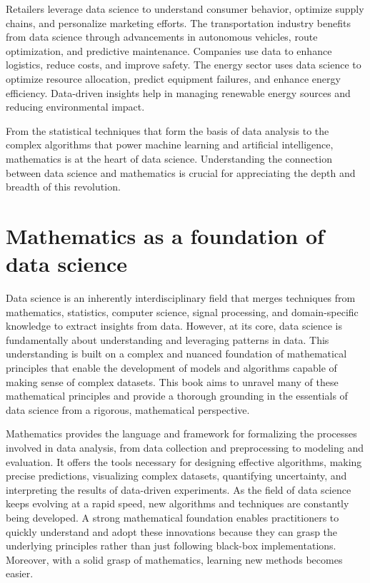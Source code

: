 Retailers leverage data science to understand consumer behavior, optimize supply chains, and personalize marketing efforts.  The transportation industry benefits from data science through advancements in autonomous vehicles, route optimization, and predictive maintenance. Companies use data to enhance logistics, reduce costs, and improve safety.
The energy sector uses data science to optimize resource allocation, predict equipment failures, and enhance energy efficiency. Data-driven insights help in managing renewable energy sources and reducing environmental impact.

From the statistical techniques that form the basis of data analysis to the complex algorithms that power machine learning and artificial intelligence, mathematics is at the heart of data science. Understanding the connection between data science and mathematics is crucial for appreciating the depth and breadth of this revolution.


\section{Mathematics as a foundation of data science}


Data science is an inherently interdisciplinary field that merges techniques from mathematics, statistics, computer science, signal processing, and domain-specific knowledge to extract insights from data. However, at its core, data science is fundamentally about understanding and leveraging patterns in data. This understanding is built on a complex and nuanced foundation of mathematical principles that enable the development of models and algorithms capable of making sense of complex datasets. This book aims to unravel many of these mathematical principles and provide a thorough grounding in the essentials of data science from a rigorous, mathematical perspective.



Mathematics provides the language and framework for formalizing the processes involved in data analysis, from data collection and preprocessing to modeling and evaluation. It offers the tools necessary for designing effective algorithms, making precise predictions, visualizing complex datasets, quantifying uncertainty, and interpreting the results of data-driven experiments. %
As the field of data science keeps evolving at a rapid speed, new algorithms and techniques are constantly being developed. A strong mathematical foundation enables practitioners to quickly understand and adopt these innovations because they can grasp the underlying principles rather than just following black-box implementations.  Moreover, with a solid grasp of mathematics, learning new methods becomes easier.

